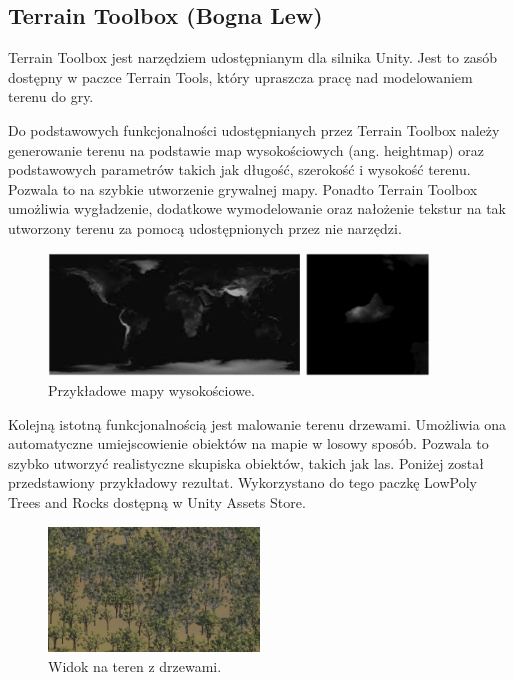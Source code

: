 \subsection{Terrain Toolbox (Bogna Lew)}\label{ss:tTool}
Terrain Toolbox jest narzędziem udostępnianym dla silnika Unity. Jest to zasób dostępny w paczce Terrain Tools, który
upraszcza pracę nad modelowaniem terenu do gry.

Do podstawowych funkcjonalności udostępnianych przez Terrain Toolbox należy generowanie terenu na podstawie
map wysokościowych (ang. heightmap) oraz podstawowych parametrów takich jak długość, szerokość i wysokość terenu.
Pozwala to na szybkie utworzenie grywalnej mapy. Ponadto Terrain Toolbox umożliwia wygładzenie, dodatkowe
wymodelowanie oraz nałożenie tekstur na tak utworzony terenu za pomocą udostępnionych przez nie narzędzi.

\begin{figure}[h!]
    \centering
    \includegraphics[width=0.9\textwidth]{images/modelowanie_terenu/przykladowe_heightmapy.jpg}
    \caption{Przykładowe mapy wysokościowe.}
\end{figure}

Kolejną istotną funkcjonalnością jest malowanie terenu drzewami. Umożliwia ona automatyczne umiejscowienie obiektów na
mapie w losowy sposób. Pozwala to szybko utworzyć realistyczne skupiska obiektów, takich jak las. Poniżej
został przedstawiony przykładowy rezultat. Wykorzystano do tego paczkę LowPoly Trees and Rocks dostępną w Unity
Assets Store.

\begin{figure}[h!]
    \centering
    \includegraphics[width=0.5\textwidth]{images/modelowanie_terenu/drzewa.jpg}
    \caption{Widok na teren z drzewami.}
\end{figure}
